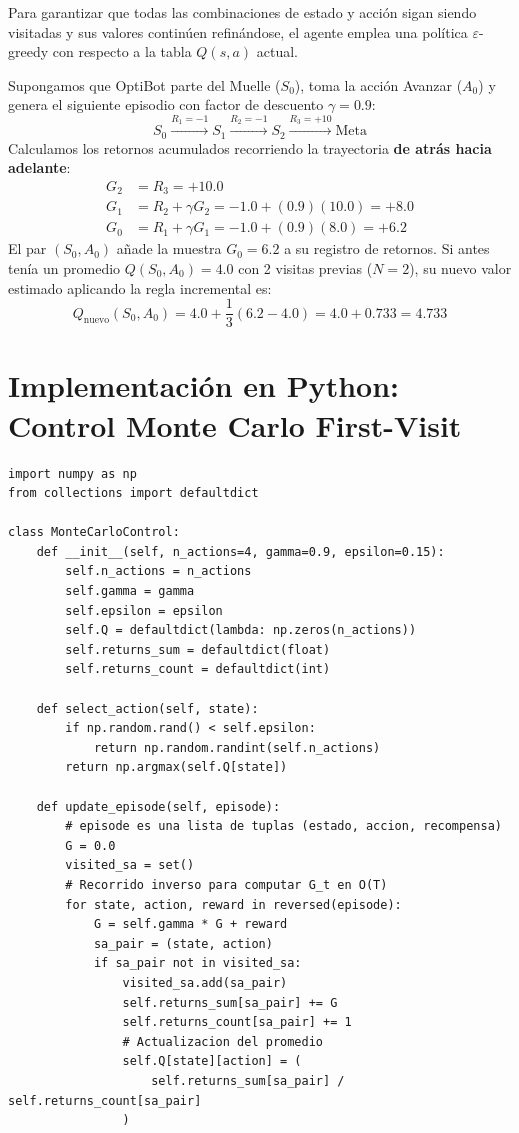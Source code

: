 Para garantizar que todas las combinaciones de estado y acción sigan siendo visitadas y sus valores continúen refinándose, el agente emplea una política $\varepsilon$-greedy con respecto a la tabla $Q(s,a)$ actual.

\begin{calculomanual}
Supongamos que OptiBot parte del Muelle ($S_0$), toma la acción Avanzar ($A_0$) y genera el siguiente episodio con factor de descuento $\gamma = 0.9$:
\[
  S_0 \xrightarrow{R_1=-1} S_1 \xrightarrow{R_2=-1} S_2 \xrightarrow{R_3=+10} \text{Meta}
\]
Calculamos los retornos acumulados recorriendo la trayectoria \textbf{de atrás hacia adelante}:
\begin{align*}
  G_2 &= R_3 = \mathbf{+10.0} \\
  G_1 &= R_2 + \gamma G_2 = -1.0 + (0.9)(10.0) = \mathbf{+8.0} \\
  G_0 &= R_1 + \gamma G_1 = -1.0 + (0.9)(8.0) = \mathbf{+6.2}
\end{align*}
El par $(S_0, A_0)$ añade la muestra $G_0 = 6.2$ a su registro de retornos. Si antes tenía un promedio $Q(S_0, A_0) = 4.0$ con 2 visitas previas ($N=2$), su nuevo valor estimado aplicando la regla incremental es:
\[
  Q_{\text{nuevo}}(S_0, A_0) = 4.0 + \frac{1}{3}(6.2 - 4.0) = 4.0 + 0.733 = \mathbf{4.733}
\]
\end{calculomanual}

\section{Implementación en Python: Control Monte Carlo First-Visit}
\begin{lstlisting}[style=rlcode]
import numpy as np
from collections import defaultdict

class MonteCarloControl:
    def __init__(self, n_actions=4, gamma=0.9, epsilon=0.15):
        self.n_actions = n_actions
        self.gamma = gamma
        self.epsilon = epsilon
        self.Q = defaultdict(lambda: np.zeros(n_actions))
        self.returns_sum = defaultdict(float)
        self.returns_count = defaultdict(int)

    def select_action(self, state):
        if np.random.rand() < self.epsilon:
            return np.random.randint(self.n_actions)
        return np.argmax(self.Q[state])

    def update_episode(self, episode):
        # episode es una lista de tuplas (estado, accion, recompensa)
        G = 0.0
        visited_sa = set()
        # Recorrido inverso para computar G_t en O(T)
        for state, action, reward in reversed(episode):
            G = self.gamma * G + reward
            sa_pair = (state, action)
            if sa_pair not in visited_sa:
                visited_sa.add(sa_pair)
                self.returns_sum[sa_pair] += G
                self.returns_count[sa_pair] += 1
                # Actualizacion del promedio
                self.Q[state][action] = (
                    self.returns_sum[sa_pair] / self.returns_count[sa_pair]
                )
\end{lstlisting}

